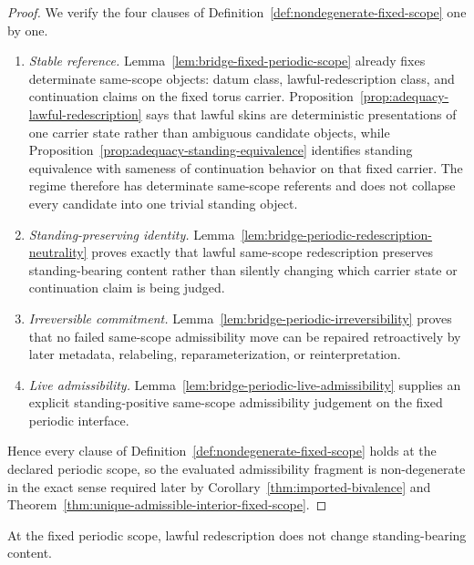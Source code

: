 \begin{proof}
We verify the four clauses of Definition~\ref{def:nondegenerate-fixed-scope} one by one.
\begin{enumerate}[label=(\roman*), leftmargin=2.2em]
\item \emph{Stable reference.} Lemma~\ref{lem:bridge-fixed-periodic-scope} already fixes determinate same-scope objects: datum class, lawful-redescription class, and continuation claims on the fixed torus carrier. Proposition~\ref{prop:adequacy-lawful-redescription} says that lawful skins are deterministic presentations of one carrier state rather than ambiguous candidate objects, while Proposition~\ref{prop:adequacy-standing-equivalence} identifies standing equivalence with sameness of continuation behavior on that fixed carrier. The regime therefore has determinate same-scope referents and does not collapse every candidate into one trivial standing object.
\item \emph{Standing-preserving identity.} Lemma~\ref{lem:bridge-periodic-redescription-neutrality} proves exactly that lawful same-scope redescription preserves standing-bearing content rather than silently changing which carrier state or continuation claim is being judged.
\item \emph{Irreversible commitment.} Lemma~\ref{lem:bridge-periodic-irreversibility} proves that no failed same-scope admissibility move can be repaired retroactively by later metadata, relabeling, reparameterization, or reinterpretation.
\item \emph{Live admissibility.} Lemma~\ref{lem:bridge-periodic-live-admissibility} supplies an explicit standing-positive same-scope admissibility judgement on the fixed periodic interface.
\end{enumerate}
Hence every clause of Definition~\ref{def:nondegenerate-fixed-scope} holds at the declared periodic scope, so the evaluated admissibility fragment is non-degenerate in the exact sense required later by Corollary~\ref{thm:imported-bivalence} and Theorem~\ref{thm:unique-admissible-interior-fixed-scope}.
\end{proof}

\begin{manuallemma}
\label{lem:bridge-periodic-redescription-neutrality}
At the fixed periodic scope, lawful redescription does not change standing-bearing content.
\end{manuallemma}

